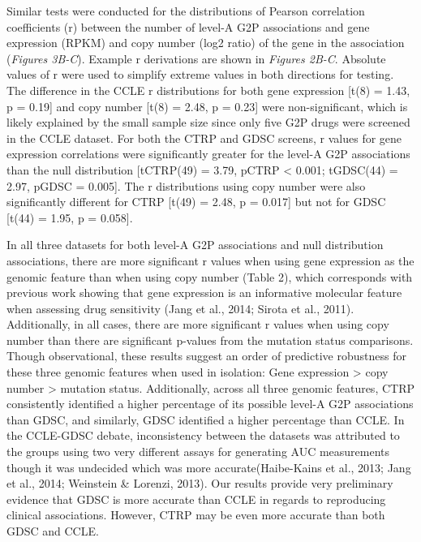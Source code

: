 \documentclass[man]{apa6}
\begin{document}
Similar tests were conducted for the distributions of Pearson
correlation coefficients (r) between the number of level-A G2P
associations and gene expression (RPKM) and copy number (log2 ratio) of
the gene in the association (\emph{Figures 3B-C}). Example r derivations
are shown in \emph{Figures 2B-C}. Absolute values of r were used to
simplify extreme values in both directions for testing. The difference
in the CCLE \textbar{}r\textbar{} distributions for both gene expression
{[}t(8) = 1.43, p = 0.19{]} and copy number {[}t(8) = 2.48, p = 0.23{]}
were non-significant, which is likely explained by the small sample size
since only five G2P drugs were screened in the CCLE dataset. For both
the CTRP and GDSC screens, \textbar{}r\textbar{} values for gene
expression correlations were significantly greater for the level-A G2P
associations than the null distribution {[}tCTRP(49) = 3.79, pCTRP
\textless{} 0.001; tGDSC(44) = 2.97, pGDSC = 0.005{]}. The
\textbar{}r\textbar{} distributions using copy number were also
significantly different for CTRP {[}t(49) = 2.48, p = 0.017{]} but not
for GDSC {[}t(44) = 1.95, p = 0.058{]}.

In all three datasets for both level-A G2P associations and null
distribution associations, there are more significant
\textbar{}r\textbar{} values when using gene expression as the genomic
feature than when using copy number (Table 2), which corresponds with
previous work showing that gene expression is an informative molecular
feature when assessing drug sensitivity (Jang et al., 2014; Sirota et
al., 2011). Additionally, in all cases, there are more significant r
values when using copy number than there are significant p-values from
the mutation status comparisons. Though observational, these results
suggest an order of predictive robustness for these three genomic
features when used in isolation: Gene expression \textgreater{} copy
number \textgreater{} mutation status. Additionally, across all three
genomic features, CTRP consistently identified a higher percentage of
its possible level-A G2P associations than GDSC, and similarly, GDSC
identified a higher percentage than CCLE. In the CCLE-GDSC debate,
inconsistency between the datasets was attributed to the groups using
two very different assays for generating AUC measurements though it was
undecided which was more accurate(Haibe-Kains et al., 2013; Jang et al.,
2014; Weinstein \& Lorenzi, 2013). Our results provide very preliminary
evidence that GDSC is more accurate than CCLE in regards to reproducing
clinical associations. However, CTRP may be even more accurate than both
GDSC and CCLE.
\end{document}
